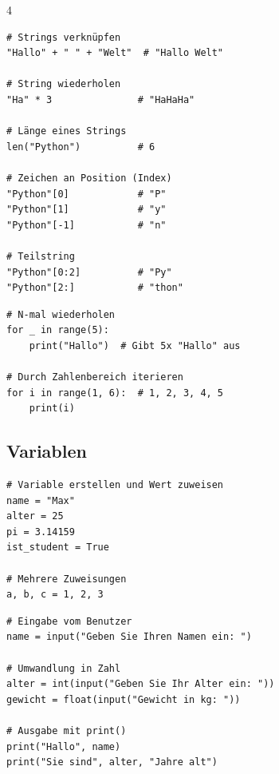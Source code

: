 \begin{landscape}
\begin{multicols*}{4}
		\begin{cheatSheetBox}[title=String-Operationen]
			\begin{lstlisting}
# Strings verknüpfen
"Hallo" + " " + "Welt"  # "Hallo Welt"

# String wiederholen
"Ha" * 3               # "HaHaHa"

# Länge eines Strings
len("Python")          # 6

# Zeichen an Position (Index)
"Python"[0]            # "P"
"Python"[1]            # "y"
"Python"[-1]           # "n"

# Teilstring
"Python"[0:2]          # "Py"
"Python"[2:]           # "thon"
\end{lstlisting}
		\end{cheatSheetBox}

		\begin{cheatSheetBox}[title=Einfache Schleifen mit \lstinline|for|]
			\begin{lstlisting}
# N-mal wiederholen
for _ in range(5):
    print("Hallo")  # Gibt 5x "Hallo" aus

# Durch Zahlenbereich iterieren
for i in range(1, 6):  # 1, 2, 3, 4, 5
    print(i)
\end{lstlisting}
		\end{cheatSheetBox}

		\columnbreak\textcolor{\cheatSheetColor}{\subsection*{Variablen}}

		\begin{cheatSheetBox}[title=Variablen deklarieren]
			\begin{lstlisting}
# Variable erstellen und Wert zuweisen
name = "Max"
alter = 25
pi = 3.14159
ist_student = True

# Mehrere Zuweisungen
a, b, c = 1, 2, 3
\end{lstlisting}
		\end{cheatSheetBox}

		\begin{cheatSheetBox}[title=Eingabe und Ausgabe]
			\begin{lstlisting}
# Eingabe vom Benutzer
name = input("Geben Sie Ihren Namen ein: ")

# Umwandlung in Zahl
alter = int(input("Geben Sie Ihr Alter ein: "))
gewicht = float(input("Gewicht in kg: "))

# Ausgabe mit print()
print("Hallo", name)
print("Sie sind", alter, "Jahre alt")


\end{lstlisting}
\end{cheatSheetBox}
\end{multicols*}
\end{landscape}
